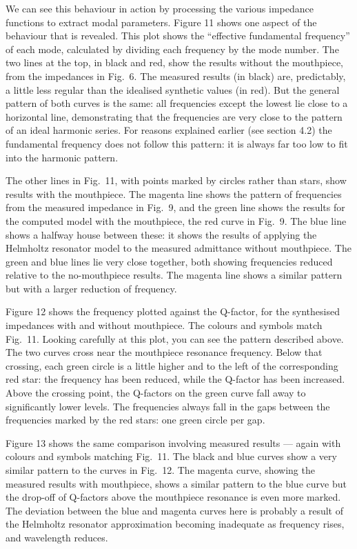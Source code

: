   We can see this behaviour in action by processing the various impedance 
  functions to extract modal parameters. Figure 11 shows one aspect of the 
  behaviour that is revealed. This plot shows the “effective fundamental 
  frequency” of each mode, calculated by dividing each frequency by the mode 
  number. The two lines at the top, in black and red, show the results without 
  the mouthpiece, from the impedances in Fig.\ 6. The measured results (in 
  black) are, predictably, a little less regular than the idealised synthetic 
  values (in red). But the general pattern of both curves is the same: all 
  frequencies except the lowest lie close to a horizontal line, demonstrating 
  that the frequencies are very close to the pattern of an ideal harmonic 
  series. For reasons explained earlier (see section 4.2) the fundamental 
  frequency does not follow this pattern: it is always far too low to fit into 
  the harmonic pattern. 

  The other lines in Fig.\ 11, with points marked by circles rather than stars, 
  show results with the mouthpiece. The magenta line shows the pattern of 
  frequencies from the measured impedance in Fig.\ 9, and the green line shows 
  the results for the computed model with the mouthpiece, the red curve in 
  Fig.\ 9. The blue line shows a halfway house between these: it shows the 
  results of applying the Helmholtz resonator model to the measured admittance 
  without mouthpiece. The green and blue lines lie very close together, both 
  showing frequencies reduced relative to the no-mouthpiece results. The 
  magenta line shows a similar pattern but with a larger reduction of 
  frequency. 

  Figure 12 shows the frequency plotted against the Q-factor, for the 
  synthesised impedances with and without mouthpiece. The colours and symbols 
  match Fig.\ 11. Looking carefully at this plot, you can see the pattern 
  described above. The two curves cross near the mouthpiece resonance 
  frequency. Below that crossing, each green circle is a little higher and to 
  the left of the corresponding red star: the frequency has been reduced, while 
  the Q-factor has been increased. Above the crossing point, the Q-factors on 
  the green curve fall away to significantly lower levels. The frequencies 
  always fall in the gaps between the frequencies marked by the red stars: one 
  green circle per gap. 

  Figure 13 shows the same comparison involving measured results — again with 
  colours and symbols matching Fig.\ 11. The black and blue curves show a very 
  similar pattern to the curves in Fig.\ 12. The magenta curve, showing the 
  measured results with mouthpiece, shows a similar pattern to the blue curve 
  but the drop-off of Q-factors above the mouthpiece resonance is even more 
  marked. The deviation between the blue and magenta curves here is probably a 
  result of the Helmholtz resonator approximation becoming inadequate as 
  frequency rises, and wavelength reduces. 

